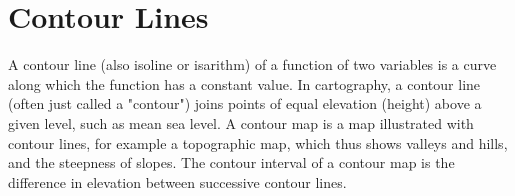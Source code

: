\documentclass[12pt, a4paper]{article}
\theoremstyle{plain}
\theoremstyle{definition}
\theoremstyle{remark}
\begin{document}
\section{Contour Lines}
A contour line (also isoline or isarithm) of a function of two variables is a curve along which the function has a constant value.
In cartography, a contour line (often just called a "contour") joins points of equal elevation (height) above a given level, such as mean sea level.
 A contour map is a map illustrated with contour lines, for example a topographic map, which thus shows valleys and hills, and the steepness of slopes.
The contour interval of a contour map is the difference in elevation between successive contour lines.
\end{document}

